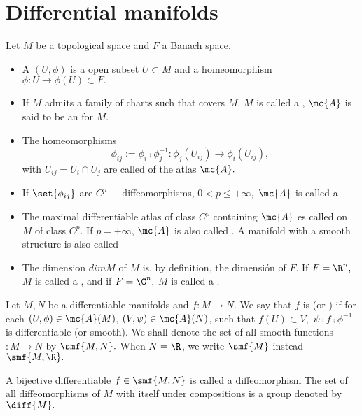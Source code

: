 \section*{Differential manifolds}

\begin{defn}
\label{marathe_defn-1.1}
 Let $M$ be a topological space and $F$ a Banach space. 

\begin{itemize}
 \item A  $(U, \phi)$ is a open subset $U \subset M$ and a homeomorphism $\phi: U \to \phi(U) \subset F.$
\item If $M$ admits a family of charts such that covers $M$, $M$ is called a , $\mc{A}$ is said to be an  for $M$. 
\item The homeomorphisms 
$$\phi_{ij}:= \phi_{i}\comp \phi_{j}^{-1}: \phi_{j}(U_{ij}) \to \phi_{i}(U_{ij}),$$ with $U_{ij}= U_{i} \cap U_{j}$ are called  of the atlas $\mc{A}.$
\item If $\set{\phi_{ij}}$ are  $C^{p}-$ diffeomorphisms, $0 < p \leq +\infty,$ $\mc{A}$ is called a  
\item The maximal differentiable atlas of class $C^{p}$ containing $\mc{A}$ es called  on $M$ of class $C^{p}.$ If $p=+\infty$, $\mc{A}$ is also called . A manifold with a smooth structure is also called 
\item The dimension $dim M$ of $M$ is, by definition, the dimensi\'on of $F.$ If $F=\R^{n},$ $M$ is called a , and if $F=\C^{n},$ $M$ is called a . 
\end{itemize}
  
\end{defn}

\begin{defn}
\label{marathe_defn-1.2}
 Let $M,N$ be a differentiable manifolds and $f:M \to N.$ We say that $f$ is  (or ) if for each $(U, \phi) \in \mc{A}(M)$, $(V, \psi) \in \mc{A}(N)$, such that $f(U)\subset V,$ $\psi \comp f \comp \phi^{-1}$ is differentiable (or smooth). We shall denote the set of all smooth functions $:M \to N$ by $\smf{M,N}.$ When $N=\R$, we write $\smf{M}$ instead $\smf{M,\R}.$ 

A bijective differentiable $f\in\smf{M,N}$ is called a diffeomorphism  The set of all diffeomorphisms of $M$ with itself under compositions is a group denoted by $\diff{M}.$ 
 \end{defn}

